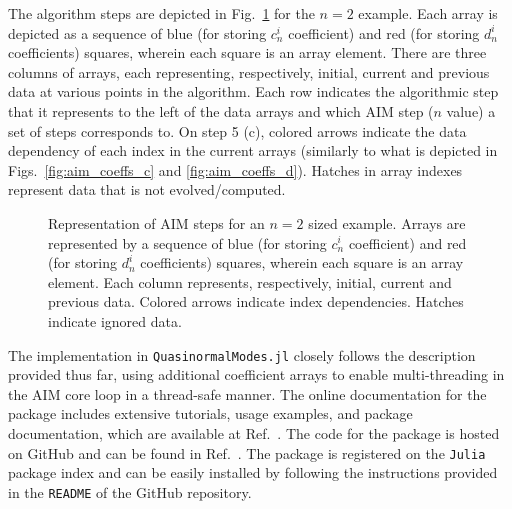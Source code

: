 %
The algorithm steps are depicted in Fig.~\ref{fig:arrays_steps} for the $n=2$ example. Each array is depicted as a sequence of blue (for storing $c^i_n$ coefficient) and red (for storing $d^i_n$ coefficients) squares, wherein each square is an array element. There are three columns of arrays, each representing, respectively, initial, current and previous data at various points in the algorithm. Each row indicates the algorithmic step that it represents to the left of the data arrays and which \ac{AIM} step ($n$ value) a set of steps corresponds to. On step 5 (c), colored arrows indicate the data dependency of each index in the current arrays (similarly to what is depicted in Figs.~\ref{fig:aim_coeffs_c} and \ref{fig:aim_coeffs_d}). Hatches in array indexes represent data that is not evolved/computed.
%
\begin{figure}[!ht]
  \centering
  \fontsize{9}{10}\selectfont
  
  \caption{Representation of \ac{AIM} steps for an $n=2$ sized example. Arrays are represented by a sequence of blue (for storing $c^i_n$ coefficient) and red (for storing $d^i_n$ coefficients) squares, wherein each square is an array element. Each column represents, respectively, initial, current and previous data. Colored arrows indicate index dependencies. Hatches indicate ignored data.}
  \label{fig:arrays_steps}
\end{figure}

The implementation in \texttt{QuasinormalModes.jl} closely follows the description provided thus far, using additional coefficient arrays to enable multi-threading in the \ac{AIM} core loop in a thread-safe manner. The online documentation for the package includes extensive tutorials, usage examples, and package documentation, which are available at Ref.~\cite{QuasinormalModesDocs}. The code for the package is hosted on GitHub and can be found in Ref.~\cite{QuasinormalModesRepo}. The package is registered on the \texttt{Julia} package index and can be easily installed by following the instructions provided in the \texttt{README} of the GitHub repository.

